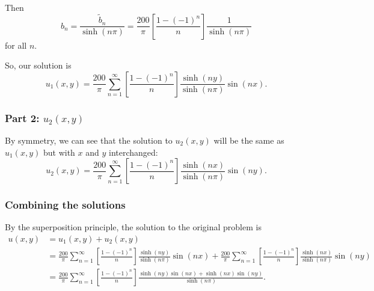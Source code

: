\documentclass[plain]{pset}
\begin{document}
\begin{solution}
    Then
    \[b_n = \frac{\tilde{b}_n}{\sinh(n\pi)} = \frac{200}{\pi} \left[\frac{1 - (-1)^n}{n}\right]\frac{1}{\sinh(n\pi)}\]
    for all \(n\).

    So, our solution is
    \[u_1(x, y) = \frac{200}{\pi}\sum_{n=1}^\infty \left[\frac{1 - (-1)^n}{n}\right] \frac{\sinh(ny)}{\sinh(n\pi)}\sin(nx).\]

    \subsubsection*{Part 2: \(u_2(x, y)\)}
    By symmetry, we can see that the solution to \(u_2(x, y)\) will be the same as \(u_1(x, y)\) but with \(x\) and \(y\) interchanged:
    \[u_2(x, y) = \frac{200}{\pi}\sum_{n=1}^\infty \left[\frac{1 - (-1)^n}{n}\right] \frac{\sinh(nx)}{\sinh(n\pi)}\sin(ny).\]

    \subsubsection*{Combining the solutions}
    By the superposition principle, the solution to the original problem is
    \begin{align*}
        u(x, y) & = u_1(x, y) + u_2(x, y)                                                                                                                                                                                               \\
                & = \frac{200}{\pi}\sum_{n=1}^\infty \left[\frac{1 - (-1)^n}{n}\right] \frac{\sinh(ny)}{\sinh(n\pi)}\sin(nx) + \frac{200}{\pi}\sum_{n=1}^\infty \left[\frac{1 - (-1)^n}{n}\right] \frac{\sinh(nx)}{\sinh(n\pi)}\sin(ny) \\
                & = \frac{200}{\pi}\sum_{n=1}^\infty \left[\frac{1 - (-1)^n}{n}\right] \frac{\sinh(ny)\sin(nx) + \sinh(nx)\sin(ny)}{\sinh(n\pi)}.
    \end{align*}
\end{solution}
\end{document}
